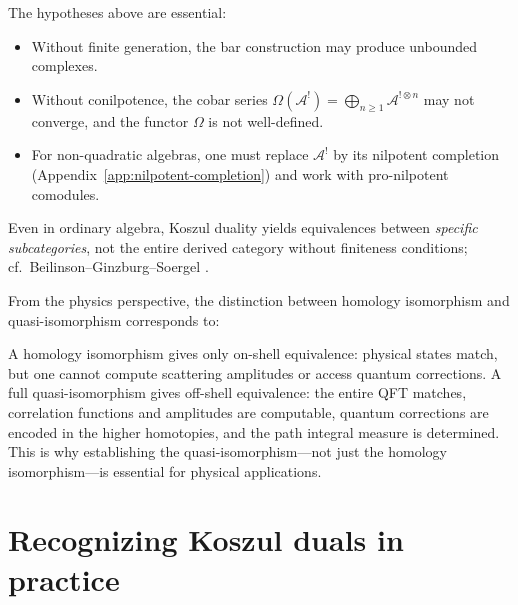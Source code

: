 \begin{remark}\label{rem:derived-equiv-scope}
The hypotheses above are essential:
\begin{itemize}
\item Without finite generation, the bar construction may produce unbounded complexes.
\item Without conilpotence, the cobar series $\Omega(\mathcal{A}^!) = \bigoplus_{n \geq 1}
\mathcal{A}^{!\otimes n}$ may not converge, and the functor $\Omega$ is not well-defined.
\item For non-quadratic algebras, one must replace $\mathcal{A}^!$ by its nilpotent
completion (Appendix~\ref{app:nilpotent-completion}) and work with pro-nilpotent
comodules.
\end{itemize}
Even in ordinary algebra, Koszul duality yields equivalences between
\emph{specific subcategories}, not the entire derived category without
finiteness conditions; cf.~Beilinson--Ginzburg--Soergel \cite{BGS96}.
\end{remark}

\begin{remark}\label{rem:qi-matters-physics}
From the physics perspective, the distinction between homology isomorphism and 
quasi-isomorphism corresponds to:

A homology isomorphism gives only on-shell equivalence: physical states match, but one cannot compute scattering amplitudes or access quantum corrections.  A full quasi-isomorphism gives off-shell equivalence: the entire QFT matches, correlation functions and amplitudes are computable, quantum corrections are encoded in the higher homotopies, and the path integral measure is determined.  This is why establishing the quasi-isomorphism---not just the homology isomorphism---is essential for physical applications.
\end{remark}


\section{Recognizing Koszul duals in practice}
\label{sec:recognizing-koszul-duals}

